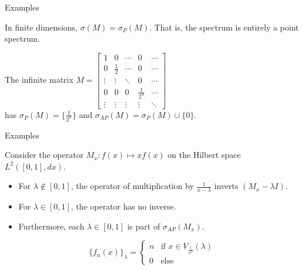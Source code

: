 \documentclass{beamer}
\begin{document}
\begin{frame}{Examples}
    \begin{example}
        In finite dimensions, $\sigma(M) = \sigma_P(M)$. That is, the
        spectrum is entirely a point spectrum.
    \end{example}
    \begin{example}
        The infinite matrix
                $ M = 
                \begin{bmatrix}
                        1 & 0           & \cdots & 0 & \cdots  \\
                        0 & \frac{1}{2} & \cdots & 0 & \cdots  \\
                        \vdots & \vdots & \ddots & 0 & \cdots  \\
                        0 & 0           & 0      & \frac{1}{2^n} & \cdots \\
                        \vdots & \vdots   & \vdots  & \vdots & \ddots
                    \end{bmatrix}
                $
                \\
                has $\sigma_P(M) = \{\frac{1}{2^n}\}$ and
                $\sigma_{AP}(M) = \sigma_P(M) \cup \{0\}$.
    \end{example}
\end{frame}

\begin{frame}{Examples}
    \begin{example}
        Consider the operator $M_x: f(x) \mapsto xf(x)$ on the Hilbert space
        $L^2([0,1],dx)$. 

        \begin{itemize}
            \item For $\lambda \not\in [0,1]$, the operator of multiplication by
                $\frac{1}{x-\lambda}$ inverts $(M_x - \lambda I)$.
            \item For $\lambda \in [0,1]$, the operator has no inverse.
            \item Furthermore, each $\lambda \in [0,1]$ is part of
                $\sigma_{AP}(M_x)$.
        \end{itemize}
            \[
                \{f_n(x)\}_{\lambda} =
            \begin{cases}
                n& \text{if } x\in V_{\frac{1}{n^2}}(\lambda)\\
                0& \text{else}
            \end{cases}
            \]
    \end{example}
\end{frame}
\end{document}
